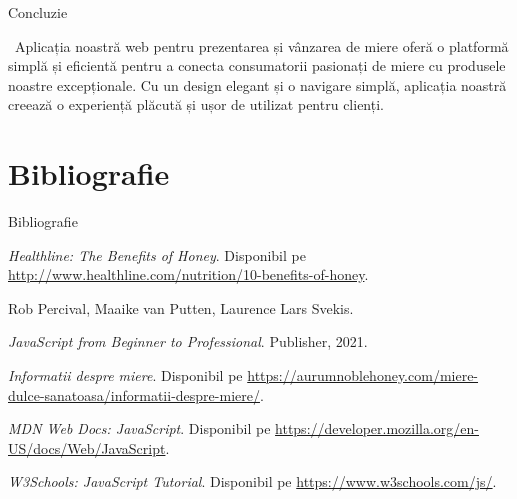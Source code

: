 \documentclass{beamer}
\begin{document}
\begin{darkframes}
		\begin{frame}[label=citations]{Concluzie}
			
			\justifying\ Aplicația noastră web pentru prezentarea și vânzarea de miere oferă o platformă simplă și eficientă pentru a conecta consumatorii pasionați de miere cu produsele noastre excepționale. Cu un design elegant și o navigare simplă, aplicația noastră creează o experiență plăcută și ușor de utilizat pentru clienți.
		\end{frame}
		
		\section{Bibliografie}
		
		\begin{frame}[label=bibliography]{Bibliografie}
			\begin{thebibliography}{9}
				
				\emph{Healthline: The Benefits of Honey}.
				Disponibil pe \url{http://www.healthline.com/nutrition/10-benefits-of-honey}.
				
				Rob Percival, Maaike van Putten, Laurence Lars Svekis.
				
				\emph{JavaScript from Beginner to Professional}.
				Publisher, 2021.
				
				\emph{Informatii despre miere}.
				Disponibil pe \url{https://aurumnoblehoney.com/miere-dulce-sanatoasa/informatii-despre-miere/}.
				
				\emph{MDN Web Docs: JavaScript}.
				Disponibil pe \url{https://developer.mozilla.org/en-US/docs/Web/JavaScript}.
				
				\emph{W3Schools: JavaScript Tutorial}.
				Disponibil pe \url{https://www.w3schools.com/js/}.
				
		\end{thebibliography}		
		\end{frame}
		
	\end{darkframes}
\end{document}
